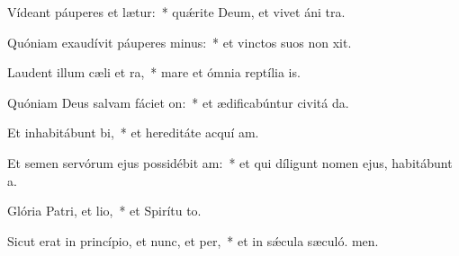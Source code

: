\item Vídeant páuperes et lætur:~* quǽrite Deum, et vivet áni tra.
\item Quóniam exaudívit páuperes minus:~* et vinctos suos non xit.
\item Laudent illum cæli et ra,~* mare et ómnia reptília  is.
\item Quóniam Deus salvam fáciet on:~* et ædificabúntur civitá da.
\item Et inhabitábunt bi,~* et hereditáte acquí am.
\item Et semen servórum ejus possidébit am:~* et qui díligunt nomen ejus, habitábunt  a.
\item Glória Patri, et lio,~* et Spirítu to.
\item Sicut erat in princípio, et nunc, et per,~* et in sǽcula sæculó. men.
